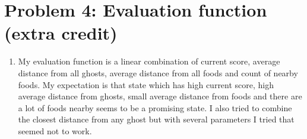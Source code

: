 \documentclass[12pt]{article}
\begin{document}
\section*{Problem 4: Evaluation function (extra credit)}
\begin{enumerate}[label=(\alph*)]
	\addtocounter{enumi}{1}
	\item 
	My evaluation function is a linear combination of current score, average distance from all ghosts, average distance from all foods and count of nearby foods. My expectation is that state which has high current score, high average distance from ghosts, small average distance from foods and there are a lot of foods nearby seems to be a promising state. I also tried to combine the closest distance from any ghost but with several parameters I tried that seemed not to work.
\end{enumerate}
\end{document}
